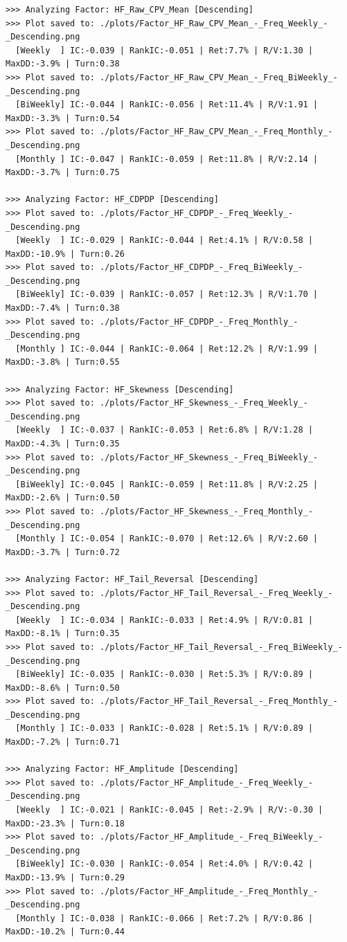 \documentclass[10pt,compsoc,UTF8]{CjC}
\begin{document}
\begin{lstlisting}
>>> Analyzing Factor: HF_Raw_CPV_Mean [Descending]
>>> Plot saved to: ./plots/Factor_HF_Raw_CPV_Mean_-_Freq_Weekly_-_Descending.png
  [Weekly  ] IC:-0.039 | RankIC:-0.051 | Ret:7.7% | R/V:1.30 | MaxDD:-3.9% | Turn:0.38
>>> Plot saved to: ./plots/Factor_HF_Raw_CPV_Mean_-_Freq_BiWeekly_-_Descending.png
  [BiWeekly] IC:-0.044 | RankIC:-0.056 | Ret:11.4% | R/V:1.91 | MaxDD:-3.3% | Turn:0.54
>>> Plot saved to: ./plots/Factor_HF_Raw_CPV_Mean_-_Freq_Monthly_-_Descending.png
  [Monthly ] IC:-0.047 | RankIC:-0.059 | Ret:11.8% | R/V:2.14 | MaxDD:-3.7% | Turn:0.75

>>> Analyzing Factor: HF_CDPDP [Descending]
>>> Plot saved to: ./plots/Factor_HF_CDPDP_-_Freq_Weekly_-_Descending.png
  [Weekly  ] IC:-0.029 | RankIC:-0.044 | Ret:4.1% | R/V:0.58 | MaxDD:-10.9% | Turn:0.26
>>> Plot saved to: ./plots/Factor_HF_CDPDP_-_Freq_BiWeekly_-_Descending.png
  [BiWeekly] IC:-0.039 | RankIC:-0.057 | Ret:12.3% | R/V:1.70 | MaxDD:-7.4% | Turn:0.38
>>> Plot saved to: ./plots/Factor_HF_CDPDP_-_Freq_Monthly_-_Descending.png
  [Monthly ] IC:-0.044 | RankIC:-0.064 | Ret:12.2% | R/V:1.99 | MaxDD:-3.8% | Turn:0.55

>>> Analyzing Factor: HF_Skewness [Descending]
>>> Plot saved to: ./plots/Factor_HF_Skewness_-_Freq_Weekly_-_Descending.png
  [Weekly  ] IC:-0.037 | RankIC:-0.053 | Ret:6.8% | R/V:1.28 | MaxDD:-4.3% | Turn:0.35
>>> Plot saved to: ./plots/Factor_HF_Skewness_-_Freq_BiWeekly_-_Descending.png
  [BiWeekly] IC:-0.045 | RankIC:-0.059 | Ret:11.8% | R/V:2.25 | MaxDD:-2.6% | Turn:0.50
>>> Plot saved to: ./plots/Factor_HF_Skewness_-_Freq_Monthly_-_Descending.png
  [Monthly ] IC:-0.054 | RankIC:-0.070 | Ret:12.6% | R/V:2.60 | MaxDD:-3.7% | Turn:0.72

>>> Analyzing Factor: HF_Tail_Reversal [Descending]
>>> Plot saved to: ./plots/Factor_HF_Tail_Reversal_-_Freq_Weekly_-_Descending.png
  [Weekly  ] IC:-0.034 | RankIC:-0.033 | Ret:4.9% | R/V:0.81 | MaxDD:-8.1% | Turn:0.35
>>> Plot saved to: ./plots/Factor_HF_Tail_Reversal_-_Freq_BiWeekly_-_Descending.png
  [BiWeekly] IC:-0.035 | RankIC:-0.030 | Ret:5.3% | R/V:0.89 | MaxDD:-8.6% | Turn:0.50
>>> Plot saved to: ./plots/Factor_HF_Tail_Reversal_-_Freq_Monthly_-_Descending.png
  [Monthly ] IC:-0.033 | RankIC:-0.028 | Ret:5.1% | R/V:0.89 | MaxDD:-7.2% | Turn:0.71

>>> Analyzing Factor: HF_Amplitude [Descending]
>>> Plot saved to: ./plots/Factor_HF_Amplitude_-_Freq_Weekly_-_Descending.png
  [Weekly  ] IC:-0.021 | RankIC:-0.045 | Ret:-2.9% | R/V:-0.30 | MaxDD:-23.3% | Turn:0.18
>>> Plot saved to: ./plots/Factor_HF_Amplitude_-_Freq_BiWeekly_-_Descending.png
  [BiWeekly] IC:-0.030 | RankIC:-0.054 | Ret:4.0% | R/V:0.42 | MaxDD:-13.9% | Turn:0.29
>>> Plot saved to: ./plots/Factor_HF_Amplitude_-_Freq_Monthly_-_Descending.png
  [Monthly ] IC:-0.038 | RankIC:-0.066 | Ret:7.2% | R/V:0.86 | MaxDD:-10.2% | Turn:0.44


\end{lstlisting}
\end{document}
